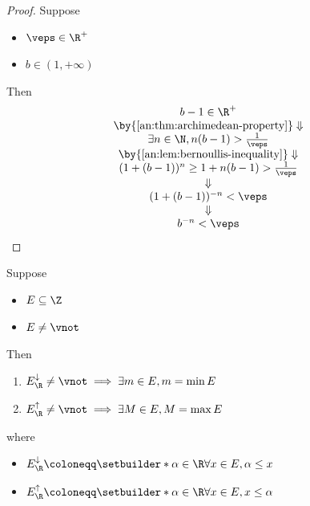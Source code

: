 \begin{proof}
  Suppose
  \begin{itemize}
    \item $\veps \in \R^{+}$
    \item $b \in (1, + \infty)$
  \end{itemize}
  Then
  \[
    \begin{array}{c}
      b - 1 \in \R^{+}                                      \\
      \by{\Cref{an:thm:archimedean-property}} \Downarrow    \\
      \exists n \in \N, n(b - 1) > \frac{1}{\veps}          \\
      \by{\Cref{an:lem:bernoullis-inequality}} \Downarrow   \\
      (1 + (b - 1))^{n} \geq 1 + n(b - 1) > \frac{1}{\veps} \\
      \Downarrow                                            \\
      (1 + (b - 1))^{-n} < \veps                            \\
      \Downarrow                                            \\
      b^{-n} < \veps
    \end{array}
  \]
\end{proof}

\bigskip

\begin{theorem} \label{an:thm:bounded-subset-of-Z-in-R-has-extremum}
  Suppose
  \begin{itemize}
    \item $E \subseteq \Z$
    \item $E \neq \vnot$
  \end{itemize}
  Then
  \begin{enumerate}[label=\textbf{(\Alph*)}]
    \item $E_{\R}^{\downarrow} \neq \vnot \implies \exists m \in E, m = \min E$
    \item $E_{\R}^{\uparrow} \neq \vnot \implies \exists M \in E, M = \max E$
  \end{enumerate}
  where
  \begin{itemize}
    \item $E_{\R}^{\downarrow} \coloneqq \setbuilder*{\alpha \in \R}{\forall x \in E, \alpha \leq x}$
    \item $E_{\R}^{\uparrow} \coloneqq \setbuilder*{\alpha \in \R}{\forall x \in E, x \leq \alpha}$
  \end{itemize}
\end{theorem}

